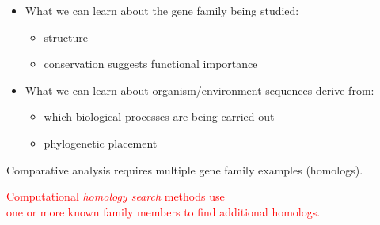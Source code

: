 \documentclass[landscape]{slides}
\begin{document}
\begin{slide}


\small
\begin{itemize}
\item What we can learn about the gene family being studied:
\begin{itemize}
  \item structure
  \item conservation suggests functional importance
\end{itemize}

\item What we can learn about organism/environment sequences derive
  from:
\begin{itemize}
  \item which biological processes are being carried out
  \item phylogenetic placement
\end{itemize}
\end{itemize}

\normalsize
\begin{center}
Comparative analysis requires multiple gene family examples
(homologs).

\textcolor{red}{Computational \emph{homology search} methods use \\ one or more known
family members to find additional homologs.}
\end{center}

\vfill
\end{slide}
%
%
\end{document}
